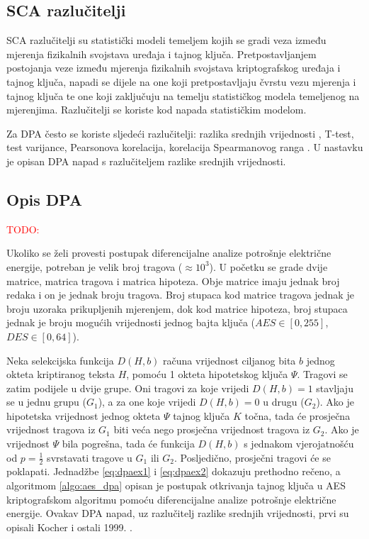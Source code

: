 \documentclass[times, utf8, numeric, diplomski]{fer}
\def\TODO#1{\noindent\textcolor{red}{TODO: \textit{#1}}\newline}
\def\todo#1{\TODO{#1}}
\begin{document}
\subsection{SCA razlučitelji}
SCA razlučitelji  su statistički modeli temeljem kojih se gradi veza između mjerenja fizikalnih svojstava uređaja i tajnog ključa. Pretpostavljanjem postojanja veze između mjerenja fizikalnih svojstava kriptografskog uređaja i tajnog ključa, napadi se dijele na one koji pretpostavljaju čvrstu vezu mjerenja i tajnog ključa te one koji zaključuju na temelju statističkog modela temeljenog na mjerenjima. Razlučitelji se koriste kod napada statističkim modelom.

Za DPA često se koriste sljedeći razlučitelji: razlika srednjih vrijednosti , T-test, test varijance, Pearsonova korelacija, korelacija Spearmanovog ranga . \citep{gierlichs2009empirical} U nastavku je opisan DPA napad s razlučiteljem razlike srednjih vrijednosti.

\subsection{Opis DPA}
\todo{}

Ukoliko se želi provesti postupak diferencijalne analize potrošnje električne energije, potreban je velik broj tragova ($\approx 10^3$). U početku se grade dvije matrice, matrica tragova i matrica hipoteza. Obje matrice imaju jednak broj redaka i on je jednak broju tragova. Broj stupaca kod matrice tragova jednak je broju uzoraka prikupljenih mjerenjem, dok kod matrice hipoteza, broj stupaca jednak je broju mogućih vrijednosti jednog bajta ključa ($AES \in [0,255]$, $DES \in [0,64]$). 

Neka selekcijska funkcija $D(H, b)$ računa vrijednost ciljanog bita $b$ jednog okteta kriptiranog teksta $H$, pomoću 1 okteta hipotetskog ključa $\Psi$. Tragovi se zatim podijele u dvije grupe. Oni tragovi za koje vrijedi $D(H, b) = 1$ stavljaju se u jednu grupu (\textit{$G_1$}), a za one koje vrijedi $D(H, b) = 0$ u drugu (\textit{$G_2$}). Ako je hipotetska vrijednost jednog okteta $\Psi$ tajnog ključa $K$ točna, tada će prosječna vrijednost tragova iz \textit{$G_1$} biti veća nego prosječna vrijednost tragova iz \textit{$G_2$}. Ako je vrijednost $\Psi$ bila pogrešna, tada će funkcija $D(H, b)$ s jednakom vjerojatnošću od $p=\frac{1}{2}$ svrstavati tragove u \textit{$G_1$} ili \textit{$G_2$}. Posljedično, prosječni tragovi će se poklapati. Jednadžbe \ref{eq:dpaex1} i \ref{eq:dpaex2} dokazuju prethodno rečeno, a algoritmom \ref{algo:aes_dpa} opisan je postupak otkrivanja tajnog ključa u AES  kriptografskom algoritmu pomoću diferencijalne analize potrošnje električne energije. Ovakav DPA napad, uz razlučitelj razlike srednjih vrijednosti, prvi su opisali Kocher i ostali 1999. \citep{2009empirical}.
\end{document}
